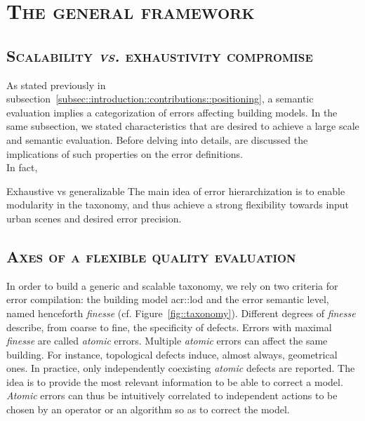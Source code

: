 \minitoc

\vfill

\clearpage

\section{\textsc{The general framework}}

    \subsection{\textsc{Scalability \textit{vs.} exhaustivity compromise}}
        As stated previously in subsection~\ref{subsec::introduction::contributions::positioning}, a semantic evaluation implies a categorization of errors affecting building models.
        In the same subsection, we stated characteristics that are desired to achieve a large scale and semantic evaluation.
        Before delving into details, are discussed the implications of such properties on the error definitions.\\

        In fact,         

        Exhaustive vs generalizable
        The main idea of error hierarchization is to enable modularity in the taxonomy, and thus achieve a strong flexibility towards input urban scenes and desired error precision.

    \subsection{\textsc{Axes of a flexible quality evaluation}}
        In order to build a generic and scalable taxonomy, we rely on two criteria for error compilation: the building model \gls{acr::lod} and the error semantic level, named henceforth \textit{finesse} (cf. Figure~\ref{fig::taxonomy}).
        Different degrees of \textit{finesse} describe, from coarse to fine, the specificity of defects.
        Errors with maximal \textit{finesse} are called \textit{atomic} errors.
        Multiple \textit{atomic} errors can affect the same building.
        For instance, topological defects induce, almost always, geometrical ones.
        In practice, only independently coexisting \textit{atomic} defects are reported.
        The idea is to provide the most relevant information to be able to correct a model.
        \textit{Atomic} errors can thus be intuitively correlated to independent actions to be chosen by an operator or an algorithm so as to correct the model.

